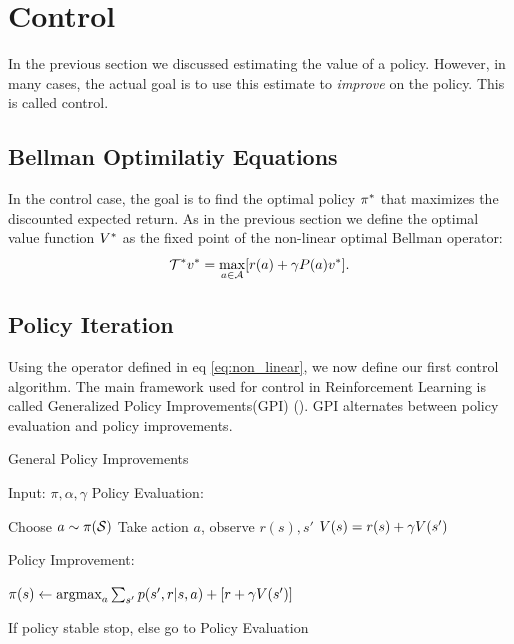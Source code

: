 \section{Control}
In the previous section we discussed estimating the value of a policy. However, in many cases, the actual goal is to use this estimate to \emph{improve} on the policy. This is called control.
\subsection{Bellman Optimilatiy Equations}
In the control case, the goal is to find the optimal policy $\pi^*$ that maximizes the discounted expected return. As in the previous section we define the optimal value function $V^*$ as the fixed point of the non-linear optimal Bellman operator:
\begin{equation}
\label{eq:non_linear}
    \mathcal{T}^* v^* = \max_{a \in \mathcal{A}} [r(a) + \gamma P(a)v^*].
\end{equation}

\subsection{Policy Iteration}
Using the operator defined in eq \ref{eq:non_linear}, we now define our first control algorithm. The main framework used for control in Reinforcement Learning is called Generalized Policy Improvements(GPI) (\cite{sutton1998reinforcement}). GPI alternates between policy evaluation and policy improvements.\\

\begin{algorithm}[H]
\caption{General Policy Improvements}
\begin{algorithmic}[1]
    \STATE Input: $\pi,\alpha,\gamma$
    \STATE Policy Evaluation:
    \begin{ALC@g}
            \STATE Choose $a \sim \pi(\mathcal{S})$
            \STATE Take action $a$, observe $r(s),s'$
            \STATE $V(s) =  r(s) + \gamma V(s') $
        \ENDFOR
    \end{ALC@g}
    \STATE Policy Improvement:
    \begin{ALC@g}
            \STATE $\pi(s) \leftarrow \text{argmax}_a \sum_{s'} p(s',r|s,a) + [r+\gamma V(s')]$
        \ENDFOR
    \end{ALC@g}
    \STATE If policy stable stop, else go to Policy Evaluation
\end{algorithmic}
\label{alg:GPI}
\end{algorithm}

